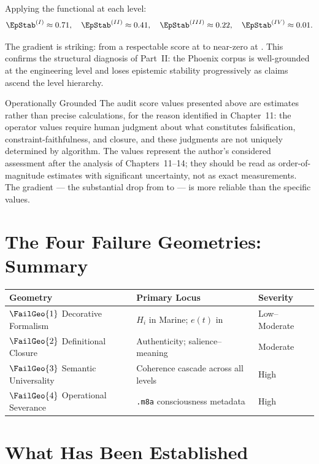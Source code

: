 Applying the functional at each level:
\[
  \EpStab^{(I)} \approx 0.71, \quad
  \EpStab^{(II)} \approx 0.41, \quad
  \EpStab^{(III)} \approx 0.22, \quad
  \EpStab^{(IV)} \approx 0.01.
\]

The gradient is striking: from a respectable score
at \LevelI{} to near-zero at \LevelIV{}. This confirms
the structural diagnosis of Part~II: the Phoenix corpus
is well-grounded at the engineering level and loses
epistemic stability progressively as claims ascend
the level hierarchy.

\begin{epistemicstatus}{Operationally Grounded}
The audit score values presented above are estimates
rather than precise calculations, for the reason
identified in Chapter~11: the operator values require
human judgment about what constitutes falsification,
constraint-faithfulness, and closure, and these
judgments are not uniquely determined by algorithm.
The values represent the author's considered assessment
after the analysis of Chapters~11--14; they should
be read as order-of-magnitude estimates with significant
uncertainty, not as exact measurements. The gradient
--- the substantial drop from \LevelI{} to \LevelIV{} ---
is more reliable than the specific values.
\end{epistemicstatus}

\section{The Four Failure Geometries: Summary}
\label{sec:fg-summary}

\begin{center}
\begin{tabular}{lll}
\toprule
Geometry & Primary Locus & Severity \\
\midrule
$\FailGeo{1}$ Decorative Formalism & $H_i$ in Marine; $e(t)$ in \MEMeight{} & Low--Moderate \\
$\FailGeo{2}$ Definitional Closure & Authenticity; salience--meaning & Moderate \\
$\FailGeo{3}$ Semantic Universality & Coherence cascade across all levels & High \\
$\FailGeo{4}$ Operational Severance & \texttt{.m8a} consciousness metadata & High \\
\bottomrule
\end{tabular}
\end{center}

\section{What Has Been Established}
\label{sec:what-established}

